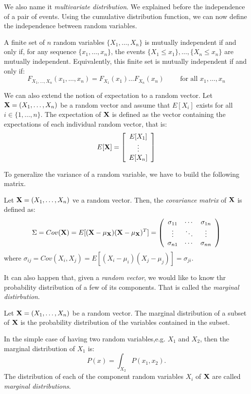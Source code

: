 We also name it \emph{multivariate distribution}.  We explained before the independence of a pair of events. Using the cumulative distribution function, we can now define the independence between random variables.
\begin{ndef}
A finite set of $n$ random variables $\{X_1,\dots,X_n\}$ is mutually independent if and only if, for any sequence $\{x_1,\dots,x_n\}$, the events $\{X_1 \leq x_1\}, \dots, \{X_n \leq x_n\}$ are mutually independent. 
Equivalently, this finite set is mutually independent if and only if:
$$
F_{X_1,\dots, X_n}(x_1,\dots,x_n) = F_{X_1}(x_1) \dots F_{X_n}(x_n) \quad \quad \text{ for all } x_1,\dots,x_n
$$
\end{ndef}


We can also extend the notion of expectation to a random vector. Let $\mathbf{X} = (X_1,\dots,X_n)$ be a random vector and assume that $E[X_i]$ exists for all $i \in \{1, \dots, n \}$. The expectation of $\mathbf{X}$ is defined as the vector containing the expectations of each individual random vector, that is:
$$
E[\mathbf{X}] = \left[ \begin{array}{c} 
E[X_1]\\
\vdots\\
E[X_n]
\end{array} \right]
$$

To generalize the variance of a random variable, we have to build the following matrix.

\begin{ndef}
Let $\mathbf{X} = (X_1,\dots,X_n)$ ve a random vector. Then, the \emph{covariance matrix} of $\mathbf{X}$ is defined as:
$$
\Sigma = Cov(\mathbf{X}) = E[(\mathbf{X} - \mu_{\mathbf{X}})(\mathbf{X} - \mu_{\mathbf{X}})^T] = \left ( \begin{array}{ccc} 
  \sigma_{11} & \cdots & \sigma_{1n}\\
  \vdots & \ddots & \vdots \\
  \sigma_{n1} & \cdots & \sigma_{nn}
  \end{array} \right )
$$
where $\sigma_{ij} = Cov(X_i,X_j) = E[(X_i - \mu_i)(X_j - \mu_j)] = \sigma_{ji}$.
\end{ndef}


It can also happen that, given a \emph{random vector}, we would like to know thr probability distribution of a few of its components. That is called the \emph{marginal distirbution}.

\begin{ndef}
Let $\mathbf{X} = (X_1,\dots,X_n)$ be a random vector. The marginal distribution of a subset of $\mathbf{X}$ is the probability distribution of the variables contained in the subset. 
\end{ndef}
In the simple case of having two random variables,e.g. $X_1$ and $X_2$, then the marginal distribution of $X_1$ is:
$$
P(x) = \int_{X_2} P(x_1,x_2).
$$
The distribution of each of the component random variables $X_i$ of $\mathbf{X}$ are called \emph{marginal distributions}.




